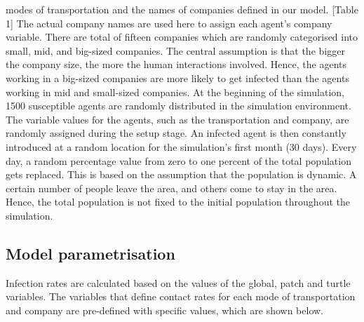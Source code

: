 \documentclass[smallextended]{svjour3}       %
\begin{document}
modes of transportation and the names of companies defined in our model.
[Table 1]
The actual company names are used here to assign each agent’s company variable. There are
total of fifteen companies which are randomly categorised into small, mid, and big-sized
companies. The central assumption is that the bigger the company size, the more the human
interactions involved. Hence, the agents working in a big-sized companies are more likely to get
infected than the agents working in mid and small-sized companies.
At the beginning of the simulation, 1500 susceptible agents are randomly distributed in the
simulation environment. The variable values for the agents, such as the transportation and
company, are randomly assigned during the setup stage. An infected agent is then constantly
introduced at a random location for the simulation's first month (30 days). Every day, a random
percentage value from zero to one percent of the total population gets replaced. This is based on
the assumption that the population is dynamic. A certain number of people leave the area, and
others come to stay in the area. Hence, the total population is not fixed to the initial population
throughout the simulation.


\subsection{Model parametrisation}

Infection rates are calculated based on the values of the global, patch and turtle variables. The
variables that define contact rates for each mode of transportation and company are pre-defined
with specific values, which are shown below.




\end{document}
